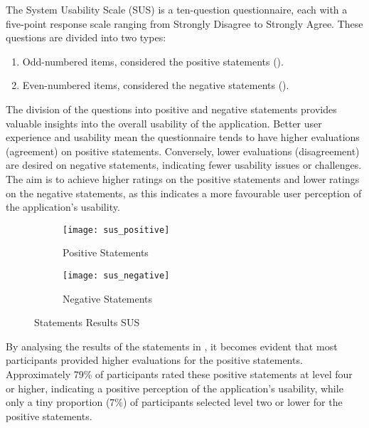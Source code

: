 The System Usability Scale (SUS) is a ten-question questionnaire, each with a
five-point response scale ranging from Strongly Disagree to Strongly Agree.
These questions are divided into two types:

\begin{enumerate}
  \item Odd-numbered items, considered the positive statements
    ().
  \item Even-numbered items, considered the negative statements
    ().
\end{enumerate}

The division of the questions into positive and negative statements provides
valuable insights into the overall usability of the application. Better user
experience and usability mean the questionnaire tends to have higher
evaluations (agreement) on positive statements. Conversely, lower evaluations
(disagreement) are desired on negative statements, indicating fewer usability
issues or challenges. The aim is to achieve higher ratings on the positive
statements and lower ratings on the negative statements, as this indicates a
more favourable user perception of the application's usability.

\begin{figure*}[!htb]
  \centering
  \begin{subfigure}[b]{1\textwidth}
    \texttt{[image: sus\_positive]}
    \caption{Positive Statements}
    \label{fig:statements_results_sus_positive}
  \end{subfigure}
  \hfill
  \begin{subfigure}[b]{1\textwidth}
    \texttt{[image: sus\_negative]}
    \caption{Negative Statements}
    \label{fig:statements_results_sus_negative}
  \end{subfigure}
  \caption{Statements Results SUS}
  \label{fig:statements_results_sus}
\end{figure*}

By analysing the results of the statements in
, it becomes evident that most participants
provided higher evaluations for the positive statements. Approximately 79\% of
participants rated these positive statements at level four or higher,
indicating a positive perception of the application's usability, while only a
tiny proportion (7\%) of participants selected level two or lower for the
positive statements.

